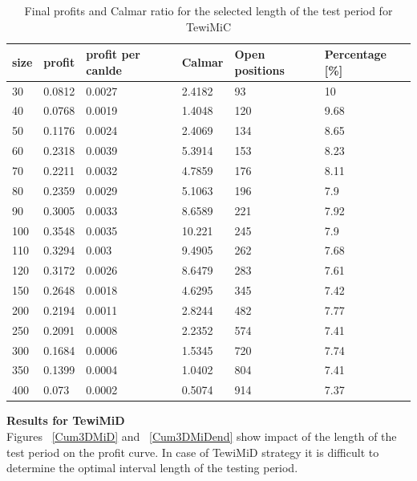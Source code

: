 \documentclass{tewiart}
\begin{document}
\begin{table}[h!] 
\caption{Final profits and Calmar ratio for the selected length of the test period for TewiMiC}
\tiny
\label{table1}
\begin{center}
\begin{tabular}{|l|l|l|l|l|l|} 
 \hline size & profit & profit per canlde & Calmar & Open positions & Percentage [\%]\\ \hline  
 30 & 0.0812 & 0.0027 & 2.4182 & 93 & 10 \\ 
 40 & 0.0768 & 0.0019 & 1.4048 & 120 & 9.68 \\ 
 50 & 0.1176 & 0.0024 & 2.4069 & 134 & 8.65 \\ 
 60 & 0.2318 & 0.0039 & 5.3914 & 153 & 8.23 \\ 
 70 & 0.2211 & 0.0032 & 4.7859 & 176 & 8.11 \\ 
 80 & 0.2359 & 0.0029 & 5.1063 & 196 & 7.9 \\ 
 90 & 0.3005 & 0.0033 & 8.6589 & 221 & 7.92 \\ 
 100 & 0.3548 & 0.0035 & 10.221 & 245 & 7.9 \\ 
 110 & 0.3294 & 0.003 & 9.4905 & 262 & 7.68 \\ 
 120 & 0.3172 & 0.0026 & 8.6479 & 283 & 7.61 \\ 
 150 & 0.2648 & 0.0018 & 4.6295 & 345 & 7.42 \\ 
 200 & 0.2194 & 0.0011 & 2.8244 & 482 & 7.77 \\ 
 250 & 0.2091 & 0.0008 & 2.2352 & 574 & 7.41 \\ 
 300 & 0.1684 & 0.0006 & 1.5345 & 720 & 7.74 \\ 
 350 & 0.1399 & 0.0004 & 1.0402 & 804 & 7.41 \\ 
400 & 0.073 & 0.0002 & 0.5074 & 914 & 7.37 \\ 
 \hline \end{tabular} 
\end{center}
 \end{table}
 \FloatBarrier


\textbf{Results for TewiMiD }\\
Figures ~\ref{Cum3DMiD} and ~\ref{Cum3DMiDend} show impact of the length of the test period on the profit curve. In case of TewiMiD strategy it is difficult to determine the optimal interval length of the testing period.
\end{document}
